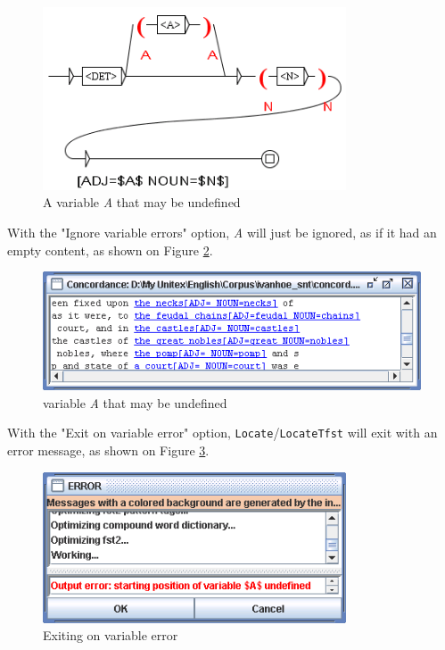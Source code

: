 \bigskip
\begin{figure}[!h]
\begin{center}
\includegraphics[width=9cm]{resources/img/fig6-advanced-options5.png}
\caption{A variable \textit{A} that may be
undefined\label{fig6-advanced-options5}}
\end{center}
\end{figure}

\noindent With the "Ignore variable errors" option, \textit{A} will just be
ignored, as if it had an empty content, as shown on Figure
\ref{fig6-advanced-options6}. 

\bigskip
\begin{figure}[!h]
\begin{center}
\includegraphics[width=12cm]{resources/img/fig6-advanced-options6.png}
\caption{
 variable \textit{A} that may be
undefined\label{fig6-advanced-options6}}
\end{center}
\end{figure}


\noindent With the "Exit on variable error" option, \verb+Locate+/\verb+LocateTfst+
will exit with an error message, as shown on Figure
\ref{fig6-advanced-options7}.

\bigskip
\begin{figure}[!h]
\begin{center}
\includegraphics[width=9cm]{resources/img/fig6-advanced-options7.png}
\caption{Exiting on variable error\label{fig6-advanced-options7}}
\end{center}
\end{figure}

